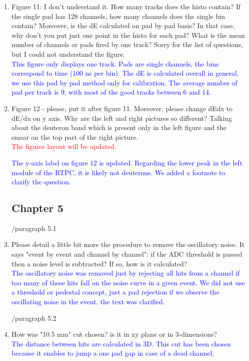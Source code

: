 \documentclass[a4paper,11pt,twoside]{article}
\begin{document}
\begin{enumerate}
\item Figure 11: I don't understand it. How many tracks does the histo contain? 
   If the single pad has 128 channels, how many channels does the single bin 
   contain? Moreover, is the dE calculated on pad by pad basis? In that case, 
   why don't you put just one point in the histo for each pad? What is the mean 
   number of channels or pads fired by one track? Sorry for the list of 
   questions, but I could not understand the figure.\\
   \textcolor{blue}{This figure only displays one track. Pads are single channels, 
the bins correspond to time (100 ns per bin). The dE is calculated overall in general,
we use this pad by pad method only for calibration. The average number of pad per 
track is 9, with most of the good tracks between 6 and 14.}

\item Figure 12 - please, put it after figure 11. Moreover, please change dEdx 
   to dE/dx on y axis. Why are the left and right pictures so different?  
   Talking about the deuteron band which is present only in the left figure and 
   the smear on the top part of the right picture. \\
\textcolor{red}{The figures layout will be updated.\\} 
   
\textcolor{blue}{The y-axis label on figure 12 is updated. Regarding the lower 
   peak in the left module of the RTPC, it is likely not deuterons. We added
   a footnote to clarify the question.} 

\subsection*{ Chapter 5}
        /paragraph 5.1	
     
\item Please detail a little bit more the procedure to remove the oscillatory 
   noise. It says "event by event and channel by channel": if the ADC threshold 
   is passed then a noise level is subtracted? If so, how is it calculated?\\
\textcolor{blue}{The oscillatory noise was removed just by rejecting all hits 
from a channel if too many of these hits fall on the noise curve in a given 
event. We did not use a threshold or pedestal concept, just a pad rejection 
if we observe the oscillating noise in the event, the text was clarified.} 

/paragraph 5.2
\item How was "10.5 mm" cut chosen? is it in xy plane or in 3-dimensions?\\
\textcolor{blue}{The distance between hits are calculated in 3D. This cut has 
been chosen because it enables to jump a one pad gap in case of a dead 
channel.} 


\end{enumerate}
\end{document}
